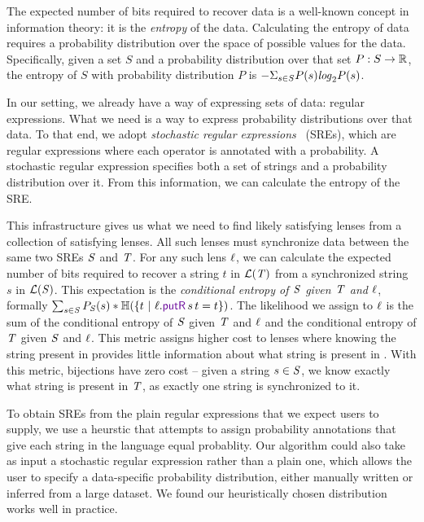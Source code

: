 \documentclass[acmsmall,screen,anonymous]{acmart}
\begin{document}
The expected number of bits required to recover data is a well-known concept in
information theory: it is the \emph{entropy} of the data. Calculating the
entropy of data requires a probability distribution over the space of possible
values for the data. Specifically, given a set $S$ and a probability
distribution over that set $P : S \rightarrow \mathbb{R}$, the entropy of $S$
with probability distribution $P$ is $-\Sigma_{s\in S}P(s)\mathit{log}_2P(s)$.

In our setting, we already have a way of expressing sets of data:
regular expressions.  What we need is a way to express probability
distributions over that data.
To that end, we adopt \emph{stochastic regular expressions}~\cite{?} (SREs), 
which are regular expressions where each operator is annotated with a
probability.  A stochastic regular expression
specifies both a set of strings and a probability
distribution over it.  From this information, we can calculate the
entropy of the SRE. 

This infrastructure gives us what we need to find likely satisfying lenses from
a collection of satisfying lenses. All such lenses must synchronize data between
the same two SREs $\mathit{S}$ and $\mathit{T}$. For any such lens $\mathit{\ell}$, we can
calculate the expected number of bits required to recover a string $t$ in
$\mathcal{L}(\mathit{T})$ from a synchronized string $s$ in
$\mathcal{L}(\mathit{S})$. This expectation is the \emph{conditional entropy of
  $\mathit{S}$ given $\mathit{T}$ and $\mathit{\ell}$}, formally $\sum_{s \in
  \Regex}\ProbabilityOf{\Regex}{s}*\EntropyOf{\SetOf{t \SuchThat
    \Lens.\PutROf{s}{t} = t}}$. The likelihood we assign to $\mathit{\ell}$ is the sum
of the conditional entropy of $\mathit{S}$ given $\mathit{T}$ and $\mathit{\ell}$ and the
conditional entropy of $\mathit{T}$ given $\mathit{S}$ and $\mathit{\ell}$. This metric
assigns higher cost to lenses where knowing the string present in \Regex
provides little information about what string is present in \RegexAlt. With this
metric, bijections have zero cost -- given a string $s \in \mathit{S}$, we know
exactly what string is present in $\mathit{T}$, as exactly one string is
synchronized to it.

To obtain SREs from the plain regular expressions that we expect users to
supply, we use a heurstic that attempts to assign probability annotations that
give each string in the language equal probablity. Our algorithm could also take
as input a stochastic regular expression rather than a plain one, which allows
the user to specify a data-specific probability distribution, either manually
written or inferred from a large dataset. We found our heuristically chosen
distribution works well in practice.
\end{document}
